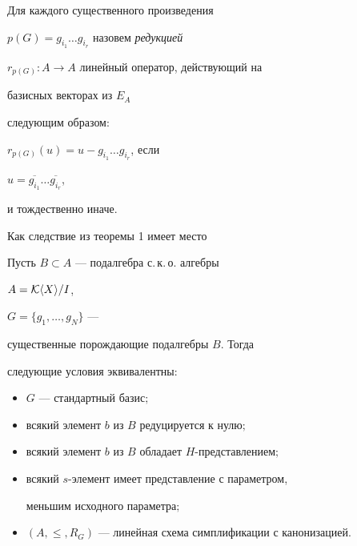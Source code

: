 \begin{defn}


Для каждого существенного произведения 


$p(G)=g_{i_{1}}\dotsc g_{i_{r}}$ назовем {\it редукцией}


$r_{p(G)}:A\rightarrow A$  линейный оператор, действующий на


базисных векторах из $E_{A}$


следующим образом:


$r_{p(G)}(u)=u-g_{i_{1}}\dotsc g_{i_{r}}$, если


$u=\overline{g_{i_{1}}}\dotsc\overline{g_{i_{r}}}$,


и тождественно иначе.


\end{defn}





Как следствие из теоремы 1  имеет место





\begin{thm}


Пусть $B\subset A$ --- подалгебра с.\,к.\,о. алгебры


$A={\cal K}\langle X\rangle /I$,


$G=\lbrace g_{1},\dotsc,g_{N}\rbrace$ ---


существенные порождающие подалгебры $B$. Тогда


следующие условия эквивалентны\/${:}$


\begin{itemize}


\item[(i)] $G$ --- стандартный базис$;$


\item[(ii)] всякий элемент $b$ из $B$ редуцируется к нулю$;$


\item[(iii)] всякий элемент $b$ из $B$ обладает $H$-представлением$;$


\item[(iv)] всякий $s$-элемент имеет представление с параметром,


меньшим исходного параметра$;$


\item[(v)] $(A,\leq,R_{G})$ --- линейная схема симплификации с канонизацией.


\end{itemize}


\end{thm}





